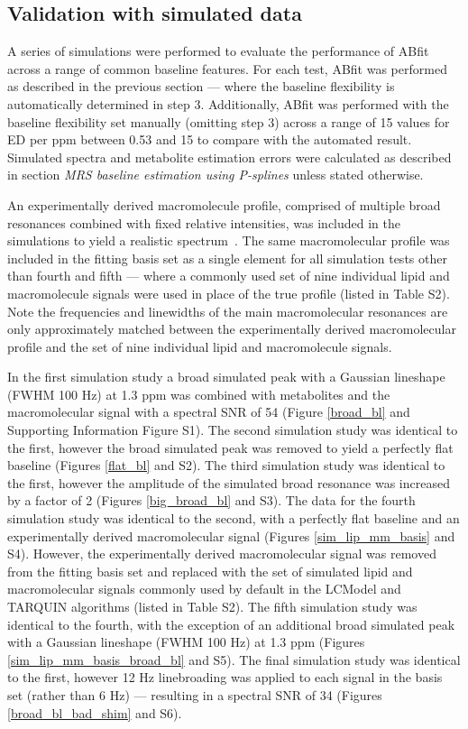 \documentclass[num-refs]{wiley-article}
\begin{document}
\subsection{Validation with simulated data}
A series of simulations were performed to evaluate the performance of ABfit across a range of common baseline features. For each test, ABfit was performed as described in the previous section --- where the baseline flexibility is automatically determined in step 3. Additionally, ABfit was performed with the baseline flexibility set manually (omitting step 3) across a range of 15 values for ED per ppm between 0.53 and 15 to compare with the automated result. Simulated spectra and metabolite estimation errors were calculated as described in section \textit{MRS baseline estimation using P-splines} unless stated otherwise.

An experimentally derived macromolecule profile, comprised of multiple broad resonances combined with fixed relative intensities, was included in the simulations to yield a realistic spectrum~\cite{Birch2017}. The same macromolecular profile was included in the fitting basis set as a single element for all simulation tests other than fourth and fifth --- where a commonly used set of nine individual lipid and macromolecule signals were used in place of the true profile (listed in Table S2). Note the frequencies and linewidths of the main macromolecular resonances are only approximately matched between the experimentally derived macromolecular profile and the set of nine individual lipid and macromolecule signals.

In the first simulation study a broad simulated peak with a Gaussian lineshape (FWHM 100 Hz) at 1.3 ppm was combined with metabolites and the macromolecular signal with a spectral SNR of 54 (Figure \ref{broad_bl} and Supporting Information Figure S1). The second simulation study was identical to the first, however the broad simulated peak was removed to yield a perfectly flat baseline (Figures \ref{flat_bl} and S2). The third simulation study was identical to the first, however the amplitude of the simulated broad resonance was increased by a factor of 2 (Figures \ref{big_broad_bl} and S3). The data for the fourth simulation study was identical to the second, with a perfectly flat baseline and an experimentally derived macromolecular signal (Figures \ref{sim_lip_mm_basis} and S4). However, the experimentally derived macromolecular signal was removed from the fitting basis set and replaced with the set of simulated lipid and macromolecular signals commonly used by default in the LCModel and TARQUIN algorithms (listed in Table S2). The fifth simulation study was identical to the fourth, with the exception of an additional broad simulated peak with a Gaussian lineshape (FWHM 100 Hz) at 1.3 ppm (Figures \ref{sim_lip_mm_basis_broad_bl} and S5). The final simulation study was identical to the first, however 12 Hz linebroading was applied to each signal in the basis set (rather than 6 Hz) --- resulting in a spectral SNR of 34 (Figures \ref{broad_bl_bad_shim} and S6).
\end{document}

